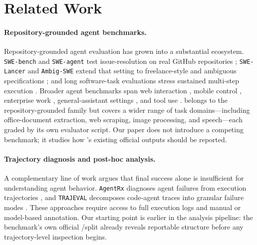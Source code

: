 \section{Related Work}

\paragraph{Repository-grounded agent benchmarks.}
Repository-grounded agent evaluation has grown into a substantial ecosystem.
\texttt{SWE-bench} and \texttt{SWE-agent} test issue-resolution on real GitHub
repositories \cite{swebench,sweagent}; \texttt{SWE-Lancer} and
\texttt{Ambig-SWE} extend that setting to freelance-style and ambiguous
specifications \cite{swelancer,ambigswe}; and long software-task evaluations
stress sustained multi-step execution \cite{longsoftwaretasks}. Broader agent
benchmarks span web interaction \cite{webarena,visualwebarena}, mobile control
\cite{androidworld}, enterprise work \cite{workarena,taubench},
general-assistant settings \cite{gaia,osworld}, and tool use
\cite{agentbench,agentboard,toolgym,deepresearchbench,mcpbench,mcpuniverse}.
\gittaskbench \cite{gittaskbench} belongs to the repository-grounded family but
covers a wider range of task domains---including office-document extraction, web
scraping, image processing, and speech---each graded by its own evaluator
script. Our paper does not introduce a competing benchmark; it studies how
\gittaskbench's existing official outputs should be reported.

\paragraph{Trajectory diagnosis and post-hoc analysis.}
A complementary line of work argues that final success alone is insufficient for
understanding agent behavior. \texttt{AgentRx} diagnoses agent failures from
execution trajectories \cite{agentrx}, and \texttt{TRAJEVAL} decomposes
code-agent traces into granular failure modes \cite{trajeval}. These approaches
require access to full execution logs and manual or model-based annotation. Our
starting point is earlier in the analysis pipeline: the benchmark's own official
\processmetric/\resultmetric split already reveals reportable structure before
any trajectory-level inspection begins.

